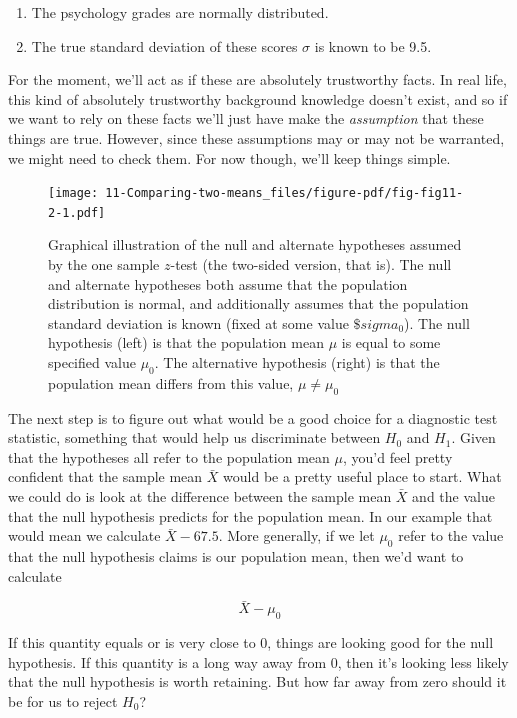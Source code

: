 \documentclass[
  a4paper,
]{book}
\providecommand{\tightlist}{%
  \setlength{\itemsep}{0pt}\setlength{\parskip}{0pt}}\usepackage{longtable,booktabs,array}
\begin{document}
\begin{enumerate}
\def\labelenumi{\arabic{enumi}.}
\tightlist
\item
  The psychology grades are normally distributed.
\item
  The true standard deviation of these scores \(\sigma\) is known to be
  9.5.
\end{enumerate}

For the moment, we'll act as if these are absolutely trustworthy facts.
In real life, this kind of absolutely trustworthy background knowledge
doesn't exist, and so if we want to rely on these facts we'll just have
make the \emph{assumption} that these things are true. However, since
these assumptions may or may not be warranted, we might need to check
them. For now though, we'll keep things simple.

\begin{figure}

\texttt{[image: 11-Comparing-two-means\_files/figure-pdf/fig-fig11-2-1.pdf]} \hfill{}

\caption{\label{fig-fig11-2}Graphical illustration of the null and
alternate hypotheses assumed by the one sample \(z\)-test (the two-sided
version, that is). The null and alternate hypotheses both assume that
the population distribution is normal, and additionally assumes that the
population standard deviation is known (fixed at some value
\(\$sigma_0\)). The null hypothesis (left) is that the population mean
\(\mu\) is equal to some specified value \(\mu_0\). The alternative
hypothesis (right) is that the population mean differs from this value,
\(\mu \neq \mu_0\)}

\end{figure}

The next step is to figure out what would be a good choice for a
diagnostic test statistic, something that would help us discriminate
between \(H_0\) and \(H_1\). Given that the hypotheses all refer to the
population mean \(\mu\), you'd feel pretty confident that the sample
mean \(\bar{X}\) would be a pretty useful place to start. What we could
do is look at the difference between the sample mean \(\bar{X}\) and the
value that the null hypothesis predicts for the population mean. In our
example that would mean we calculate \(\bar{X} - 67.5\). More generally,
if we let \(\mu_0\) refer to the value that the null hypothesis claims
is our population mean, then we'd want to calculate

\[\bar{X}-\mu_0\]

If this quantity equals or is very close to 0, things are looking good
for the null hypothesis. If this quantity is a long way away from 0,
then it's looking less likely that the null hypothesis is worth
retaining. But how far away from zero should it be for us to reject
\(H_0\)?
\end{document}
